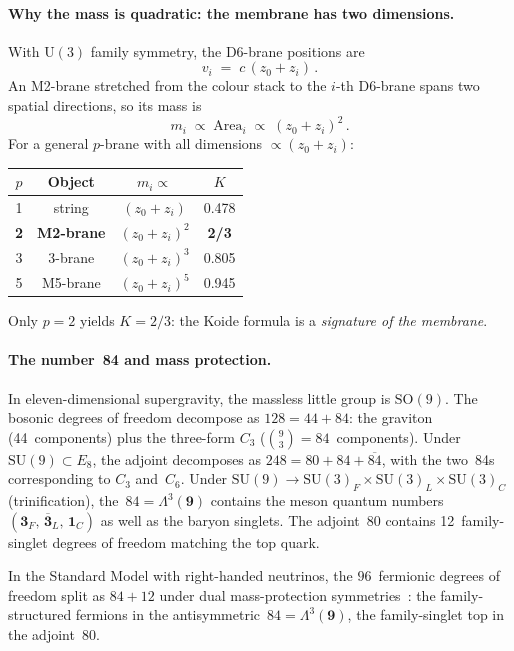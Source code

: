 \documentclass[12pt,a4paper]{article}
\newcommand{\SU}{\mathrm{SU}}
\begin{document}
\paragraph{Why the mass is quadratic: the membrane has two dimensions.}
With $\mathrm{U}(3)$ family symmetry, the D6-brane positions are
\begin{equation}
  v_i \;=\; c\,(z_0 + z_i)\,.
  \label{eq:D6positions}
\end{equation}
An M2-brane stretched from the colour stack to the $i$-th
D6-brane spans two spatial directions, so its mass is
\begin{equation}
  m_i \;\propto\; \mathrm{Area}_i
      \;\propto\; (z_0 + z_i)^2\,.
  \label{eq:M2area}
\end{equation}
For a general $p$-brane with all dimensions $\propto (z_0 + z_i)$:
\begin{center}
\begin{tabular}{cccc}
\toprule
$p$ & Object & $m_i \propto$ & $K$ \\
\midrule
1 & string & $(z_0{+}z_i)$ & 0.478 \\
\textbf{2} & \textbf{M2-brane} & $(z_0{+}z_i)^2$ & \textbf{2/3} \\
3 & 3-brane & $(z_0{+}z_i)^3$ & 0.805 \\
5 & M5-brane & $(z_0{+}z_i)^5$ & 0.945 \\
\bottomrule
\end{tabular}
\end{center}
Only $p = 2$ yields $K = 2/3$: the Koide formula is a
\emph{signature of the membrane}.

\paragraph{The number~84 and mass protection.}
In eleven-dimensional supergravity, the massless little group is
$\mathrm{SO}(9)$.  The bosonic degrees of freedom decompose as
$128 = 44 + 84$: the graviton (44~components) plus the three-form
$C_3$ ($\binom{9}{3} = 84$~components).
Under $\SU(9) \subset E_8$, the adjoint decomposes as
$248 = 80 + 84 + \overline{84}$, with the two~84s corresponding
to $C_3$ and~$C_6$.
Under $\SU(9) \to \SU(3)_F \times \SU(3)_L
\times \SU(3)_C$ (trinification), the~$84 = \Lambda^3(\mathbf{9})$
contains the meson quantum numbers
$(\mathbf{3}_F,\,\overline{\mathbf{3}}_L,\,\mathbf{1}_C)$
as well as the baryon singlets.
The adjoint~80 contains
12~family-singlet degrees of freedom matching the top quark.

In the Standard Model with right-handed neutrinos, the
$96$~fermionic degrees of freedom split as $84 + 12$ under dual
mass-protection symmetries~\cite{Rivero:2024epjc}:
the family-structured fermions in the
antisymmetric~$84 = \Lambda^3(\mathbf{9})$, the family-singlet top
in the adjoint~$80$.
\end{document}
